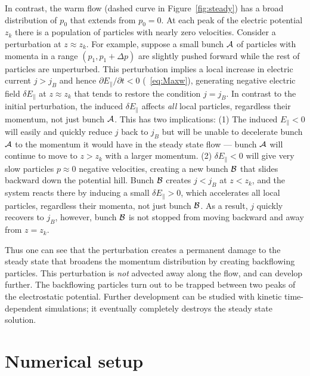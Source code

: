 In contrast, the warm flow (dashed curve in Figure~\ref{fig:steady}) has a broad distribution
of $p_0$ that extends from $p_0=0$. At each peak of the electric potential
$z_k$ there is a population of particles with nearly zero velocities. Consider a
perturbation at $z\approx z_k$. For example, suppose
a small bunch ${\cal A}$ of particles with momenta in a range $(p_1,p_1+\Delta p)$
are slightly pushed forward while the rest of particles are unperturbed.
This perturbation implies a local increase in electric current $j>j_B$ and hence
$\partial E_\parallel/\partial t<0$ (\Eq~\ref{eq:Maxw}), generating negative
electric field $\delta E_\parallel$ at $z\approx z_k$ that tends to restore the
condition $j=j_B$. In contrast to the initial perturbation,
the induced $\delta E_\parallel$ affects {\it all} local particles, regardless their
momentum, not just bunch ${\cal A}$. This has two implications:
(1) The induced $E_\parallel<0$ will easily and quickly reduce $j$ back to $j_B$ but
will be unable to decelerate bunch ${\cal A}$ to the momentum it would have in the
steady state flow --- bunch ${\cal A}$ will continue to move to $z>z_k$ with a larger
momentum.
(2) $\delta E_\parallel<0$ will give very slow particles $p\approx 0$ negative velocities,
creating a new bunch ${\cal B}$ that slides backward down the potential hill. Bunch ${\cal B}$
creates $j<j_B$ at $z<z_k$, and the system reacts there by inducing a small
$\delta E_\parallel > 0$, which accelerates all local particles, regardless their momenta,
not just bunch ${\cal B}$. As a result, $j$ quickly recovers to $j_B$, however, bunch ${\cal B}$
is not stopped from moving backward and away from $z=z_k$.

Thus one can see that the perturbation creates a permanent damage
to the steady state that broadens the momentum distribution by creating backflowing
particles.
This perturbation is {\it not} advected away along the flow, and can develop further.
The backflowing particles turn out to be trapped between two peaks of the
electrostatic potential. Further development can be studied with kinetic time-dependent
simulations; it eventually completely destroys the steady state solution.



\section{Numerical setup}\label{sec:setup}


